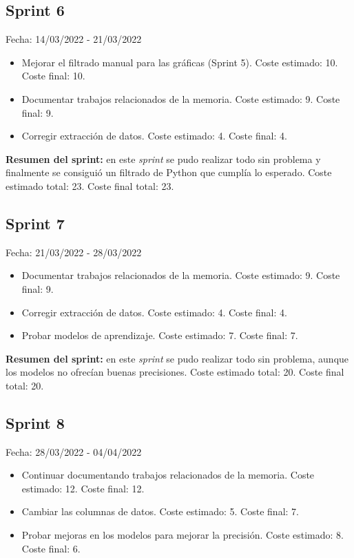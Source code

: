 \subsection{Sprint 6}
Fecha: 14/03/2022 - 21/03/2022
\begin{itemize}
	\item Mejorar el filtrado manual para las gráficas (Sprint 5). Coste estimado: 10. Coste final: 10.
	\item Documentar trabajos relacionados de la memoria. Coste estimado: 9. Coste final: 9.
	\item Corregir extracción de datos. Coste estimado: 4. Coste final: 4.
\end{itemize}

\textbf{Resumen del sprint:} en este \textit{sprint} se pudo realizar todo sin problema y finalmente se consiguió un filtrado de Python que cumplía lo esperado. Coste estimado total: 23. Coste final total: 23.

\subsection{Sprint 7}
Fecha: 21/03/2022 - 28/03/2022
\begin{itemize}
	\item Documentar trabajos relacionados de la memoria. Coste estimado: 9. Coste final: 9.
	\item Corregir extracción de datos. Coste estimado: 4. Coste final: 4.
	\item Probar modelos de aprendizaje. Coste estimado: 7. Coste final: 7.
\end{itemize}

\textbf{Resumen del sprint:} en este \textit{sprint} se pudo realizar todo sin problema, aunque los modelos no ofrecían buenas precisiones. Coste estimado total: 20. Coste final total: 20.

\subsection{Sprint 8}
Fecha: 28/03/2022 - 04/04/2022
\begin{itemize}
	\item Continuar documentando trabajos relacionados de la memoria. Coste estimado: 12. Coste final: 12.
	\item Cambiar las columnas de datos. Coste estimado: 5. Coste final: 7.
	\item Probar mejoras en los modelos para mejorar la precisión. Coste estimado: 8. Coste final: 6.
\end{itemize}

